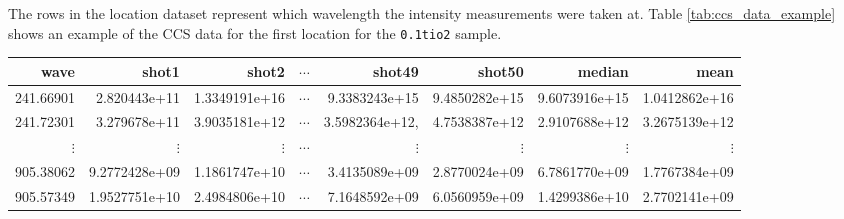 The rows in the location dataset represent which wavelength the intensity measurements were taken at.
Table \ref{tab:ccs_data_example} shows an example of the CCS data for the first location for the \texttt{0.1tio2} sample.

\begin{table*}[ht]
\centering
\begin{tabular}{rrrrrrrr}
\toprule
     wave &        shot1 &      shot2 &      $\cdots$ &       shot49 &       shot50 & median & mean \\
\midrule
241.66901 & 2.820443e+11 & 1.3349191e+16 & $\cdots$ & 9.3383243e+15 & 9.4850282e+15 & 9.6073916e+15 & 1.0412862e+16 \\
241.72301 & 3.279678e+11 & 3.9035181e+12 & $\cdots$ & 3.5982364e+12, & 4.7538387e+12 & 2.9107688e+12 & 3.2675139e+12 \\
$\vdots$  & $\vdots$     & $\vdots$ & $\cdots$ & $\vdots$ & $\vdots$ & $\vdots$ & $\vdots$ \\
905.38062 & 9.2772428e+09 & 1.1861747e+10 & $\cdots$ & 3.4135089e+09 & 2.8770024e+09 & 6.7861770e+09 & 1.7767384e+09 \\
905.57349 & 1.9527751e+10 & 2.4984806e+10 & $\cdots$ & 7.1648592e+09 & 6.0560959e+09 & 1.4299386e+10 & 2.7702141e+09 \\ 
\bottomrule
\end{tabular}
\caption{Example of CCS data for the first sample in the \texttt{0.1tio2} directory.}
\label{tab:ccs_data_example}
\end{table*}
